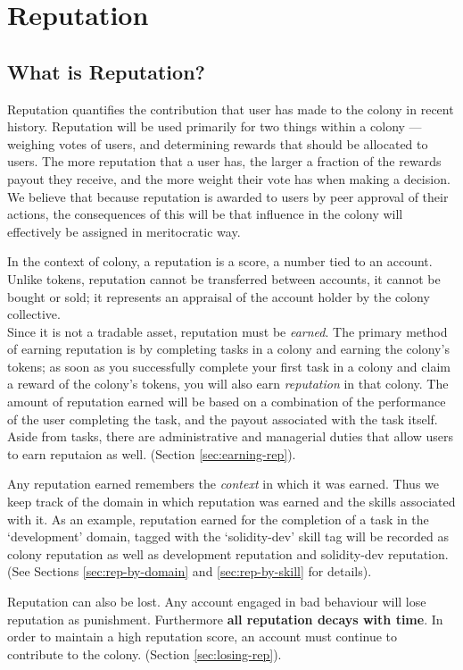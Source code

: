 \section{Reputation}
\subsection{What is Reputation?}

Reputation quantifies the contribution that user has made to the colony in recent history. Reputation will be used primarily for two things within a colony --- weighing votes of users, and determining rewards that should be allocated to users. The more reputation that a user has, the larger a fraction of the rewards payout they receive, and the more weight their vote has when making a decision. We believe that because reputation is awarded to users by peer approval of their actions, the consequences of this will be that influence in the colony will effectively be assigned in meritocratic way.

In the context of colony, a reputation is a score, a number tied to an account. Unlike tokens, reputation cannot be transferred between accounts, it cannot be bought or sold; it represents an appraisal of the account holder by the colony collective.\\
Since it is not a tradable asset, reputation must be \emph{earned}. The primary method of earning reputation is by completing tasks in a colony and earning the colony's tokens; as soon as you successfully complete your first task in a colony and claim a reward of the colony's tokens, you will also earn \emph{reputation} in that colony. The amount of reputation earned will be based on a combination of the performance of the user completing the task, and the payout associated with the task itself. Aside from tasks, there are administrative and managerial duties that allow users to earn reputaion as well. (Section \ref{sec:earning-rep}).

Any reputation earned remembers the \emph{context} in which it was earned. Thus we keep track of the domain in which reputation was earned and the skills associated with it. As an example, reputation earned for the completion of a task in the `development' domain, tagged with the `solidity-dev' skill tag will be recorded as colony reputation as well as development reputation and solidity-dev reputation. (See Sections \ref{sec:rep-by-domain} and \ref{sec:rep-by-skill} for details).

Reputation can also be lost. Any account engaged in bad behaviour will lose reputation as punishment. Furthermore \textbf{all reputation decays with time}. %
In order to maintain a high reputation score, an account must continue to contribute to the colony. (Section \ref{sec:losing-rep}).\\

